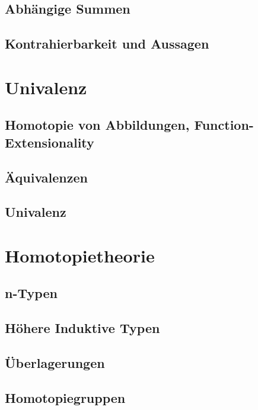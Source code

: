 \documentclass[a4paper,12pt]{article}
\theoremstyle{break}
\theoremstyle{nonumberbreak}
\theoremstyle{nonumberplain}
\begin{document}
\subsection{Abhängige Summen}
\subsection{Kontrahierbarkeit und Aussagen}

\section{Univalenz}
\subsection{Homotopie von Abbildungen, Function-Extensionality}
\subsection{Äquivalenzen}
\subsection{Univalenz}

\section{Homotopietheorie}
\subsection{n-Typen}
\subsection{Höhere Induktive Typen}
\subsection{Überlagerungen}
\subsection{Homotopiegruppen}

\printindex
\end{document}
